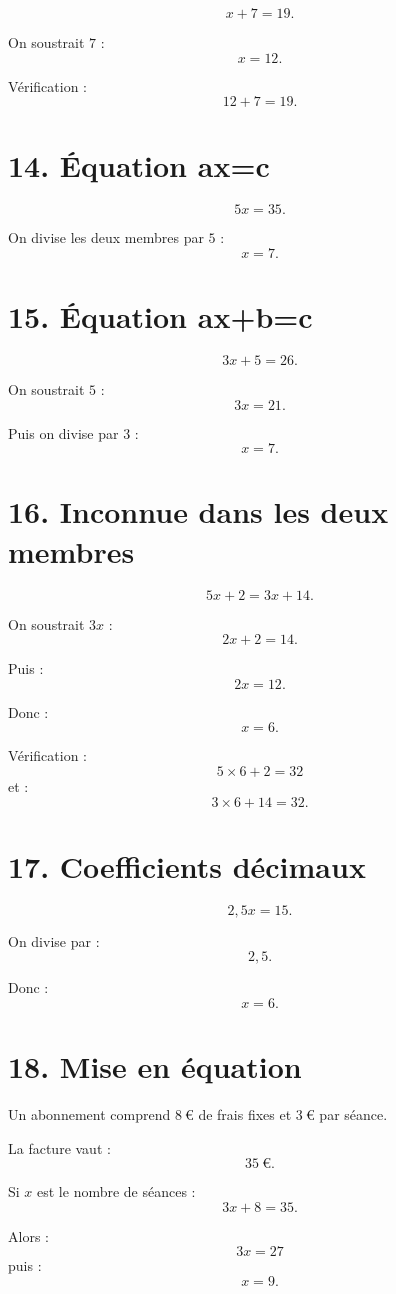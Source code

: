 \[
x+7=19.
\]

On soustrait $7$ :
\[
x=12.
\]

Vérification :
\[
12+7=19.
\]

\section{14. Équation ax=c}

\[
5x=35.
\]

On divise les deux membres par $5$ :
\[
\boxed{x=7}.
\]

\section{15. Équation ax+b=c}

\[
3x+5=26.
\]

On soustrait $5$ :
\[
3x=21.
\]

Puis on divise par $3$ :
\[
\boxed{x=7}.
\]

\section{16. Inconnue dans les deux membres}

\[
5x+2=3x+14.
\]

On soustrait $3x$ :
\[
2x+2=14.
\]

Puis :
\[
2x=12.
\]

Donc :
\[
\boxed{x=6}.
\]

Vérification :
\[
5\times6+2=32
\]
et :
\[
3\times6+14=32.
\]

\section{17. Coefficients décimaux}

\[
2{,}5x=15.
\]

On divise par :
\[
2{,}5.
\]

Donc :
\[
\boxed{x=6}.
\]

\section{18. Mise en équation}

Un abonnement comprend $8\ \text{€}$ de frais fixes et $3\ \text{€}$ par séance.

La facture vaut :
\[
35\ \text{€}.
\]

Si $x$ est le nombre de séances :
\[
3x+8=35.
\]

Alors :
\[
3x=27
\]
puis :
\[
x=9.
\]

